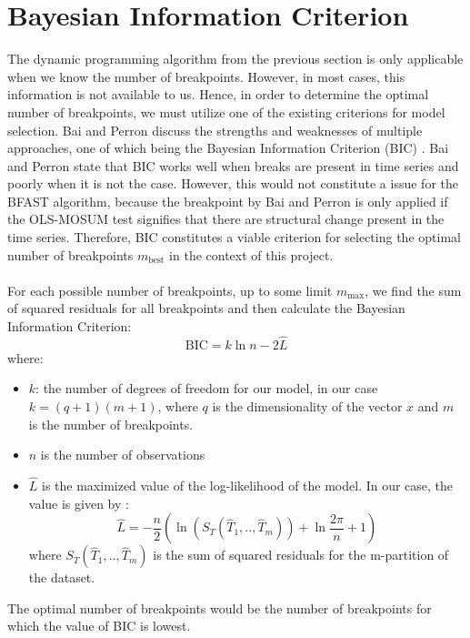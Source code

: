 \documentclass[main.tex]{subfiles}
\begin{document}
\section{Bayesian Information Criterion}
\label{sec:bayesian_information_criterion}
The dynamic programming algorithm from the previous section is only applicable when we know
the number of breakpoints. However, in most cases, this information is not available to us.
Hence, in order to determine the optimal number of breakpoints, we must utilize
one of the existing criterions for model selection. Bai and Perron \cite{bai_perron} discuss
the strengths and weaknesses of multiple approaches, one of which being
the Bayesian Information Criterion (BIC) \cite{schwarz1978}.
Bai and Perron state that BIC works well when breaks are present
in time series and poorly when it is not the case. However, this would not
constitute a issue for
the BFAST algorithm, because the breakpoint by Bai and Perron is only applied if
the OLS-MOSUM test signifies that there are structural change present in the
time series. Therefore, BIC constitutes a viable criterion for selecting the
optimal number of breakpoints $m_{\text{best}}$ in the context of this project.\\\\
For each possible number of breakpoints, up to some
limit $m_{\text{max}}$, we find the sum of squared residuals for all breakpoints
and
then calculate the Bayesian Information Criterion:
\[
\text{BIC} = k \ln{n} - 2 {\hat{L}}
\]
where:
\begin{itemize}
\item $k$: the number of degrees of freedom for our model, in our case
  $k = (q + 1) (m + 1)$, where $q$ is the dimensionality of the vector $x$ and
  $m$ is the number of breakpoints.
\item $n$ is the number of observations
\item $\hat{L}$ is the maximized value of the log-likelihood of the model. In our case,
  the value is given by \cite{yao1988}:
  \[
  \hat{L} = -\frac{n}{2} \left(\ln \left(S_T(\hat{T}_1,..,\hat{T}_m)\right)
  + \ln{\frac{2\pi}{n}} + 1\right)
  \]
  where $S_T(\hat{T}_1,..,\hat{T}_m)$ is the sum of squared residuals for the m-partition of
  the dataset.
\end{itemize}
The optimal number of breakpoints would be the number of breakpoints for which
the value of BIC is lowest.
\end{document}
